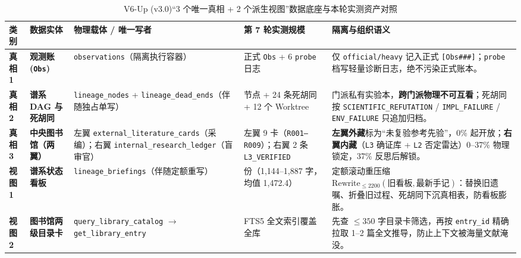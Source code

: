 \documentclass[11pt,a4paper]{ctexart}
\theoremstyle{remark}
\begin{document}
\begin{table}[htbp]
\centering
\caption{V6-Up (v3.0)“3 个唯一真相 + 2 个派生视图”数据底座与本轮实测资产对照}
\label{tab:truth_views}
\footnotesize
\begin{tabularx}{\textwidth}{@{}p{1.2cm}>{\raggedright\arraybackslash}p{2.05cm}>{\raggedright\arraybackslash}p{4.15cm}>{\raggedright\arraybackslash}p{2.35cm}>{\raggedright\arraybackslash}X@{}}
\toprule
\textbf{类别} & \textbf{数据实体} & \textbf{物理载体 / 唯一写者} & \textbf{第 7 轮实测规模} & \textbf{隔离与组织语义} \\
\midrule
\textbf{真相 1} & \textbf{观测账 (\texttt{Obs})} & \texttt{observations}（隔离执行容器） & 1 正式 \texttt{Obs} + 6 \texttt{probe} 日志 & 仅 \texttt{official/heavy} 记入正式 \texttt{[Obs\#\#\#]}；\texttt{probe} 档写轻量诊断日志，绝不污染正式账本。 \\
\textbf{真相 2} & \textbf{谱系 DAG 与死胡同} & \texttt{lineage\_nodes} + \texttt{lineage\_dead\_ends}（伴随独占单写） & 14 节点 + 24 条死胡同 + 12 个 Worktree & 门派私有实验本，\textbf{跨门派物理不可互看}；死胡同按 \texttt{SCIENTIFIC\_REFUTATION} / \texttt{IMPL\_FAILURE} / \texttt{ENV\_FAILURE} 只追加归档。 \\
\textbf{真相 3} & \textbf{中央图书馆（两翼）} & 左翼 \texttt{external\_literature\_cards}（采编）；右翼 \texttt{internal\_research\_ledger}（盲审官） & 左翼 9 卡（\texttt{R001--R009}）；右翼 2 条 \texttt{L3\_VERIFIED} & \textbf{左翼外藏}标为“未复验参考先验”，0\% 起开放；\textbf{右翼内藏}（\texttt{L3} 确证库 + \texttt{L2} 否定雷达）0--37\% 物理锁定，37\% 反思后解锁。 \\
\textbf{视图 1} & \textbf{谱系状态看板} & \texttt{lineage\_briefings}（伴随定额重写） & 14 份（1,144--1,887 字，均值 1,472.4） & 定额滚动重压缩 $\text{Rewrite}_{\le 2200}(\text{旧看板}, \text{最新手记})$：替换旧遗嘱、折叠旧过程、死胡同下沉真相表，防看板膨胀。 \\
\textbf{视图 2} & \textbf{图书馆两级目录卡} & \texttt{query\_library\_catalog} $\to$ \texttt{get\_library\_entry} & FTS5 全文索引覆盖全库 & 先查 $\le 350$ 字目录卡筛选，再按 \texttt{entry\_id} 精确拉取 1--2 篇全文推导，防止上下文被海量文献淹没。 \\
\bottomrule
\end{tabularx}
\end{table}
\end{document}
